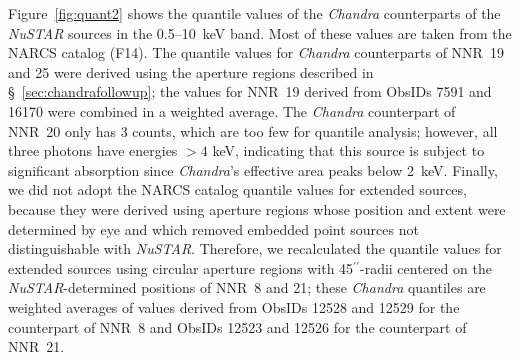 \documentclass[iop,revtex4]{emulateapj}
\begin{document}
Figure~\ref{fig:quant2} shows the quantile values of the \textit{Chandra} counterparts of the \textit{NuSTAR} sources in the 0.5--10~keV band.  Most of these values are taken from the NARCS catalog (F14).  The quantile values for \textit{Chandra} counterparts of NNR~19 and 25 were derived using the aperture regions described in \S~\ref{sec:chandrafollowup}; the values for NNR~19 derived from ObsIDs 7591 and 16170 were combined in a weighted average.  The \textit{Chandra} counterpart of NNR~20 only has 3 counts, which are too few for quantile analysis; however, all three photons have energies $>4$ keV, indicating that this source is subject to significant absorption since \textit{Chandra}'s effective area peaks below 2~keV.  Finally, we did not adopt the NARCS catalog quantile values for extended sources, because they were derived using aperture regions whose position and extent were determined by eye and which removed embedded point sources not distinguishable with \textit{NuSTAR}.  Therefore, we recalculated the quantile values for extended sources using circular aperture regions with 45$^{\prime\prime}$-radii centered on the \textit{NuSTAR}-determined positions of NNR~8 and 21; these \textit{Chandra} quantiles are weighted averages of values derived from ObsIDs 12528 and 12529\footnotemark{} for the counterpart of NNR~8 and ObsIDs 12523 and 12526 for the counterpart of NNR~21.  \par
\end{document}
